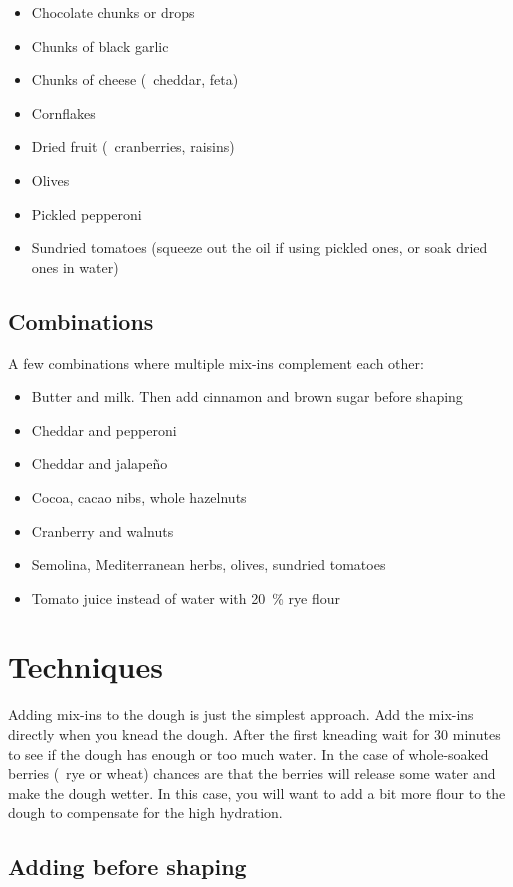 \begin{itemize}
  \item Chocolate chunks or drops
  \item Chunks of black garlic
  \item Chunks of cheese (\eg~cheddar, feta)
  \item Cornflakes
  \item Dried fruit (\eg~cranberries, raisins)
  \item Olives
  \item Pickled pepperoni
  \item Sundried tomatoes (squeeze out the oil if using pickled ones, or soak
      dried ones in water)
\end{itemize}

\subsection{Combinations}
A few combinations where multiple mix-ins complement each other:

\begin{itemize}
  \item Butter and milk. Then add cinnamon and brown sugar before shaping
  \item Cheddar and pepperoni
  \item Cheddar and jalapeño
  \item Cocoa, cacao nibs, whole hazelnuts
  \item Cranberry and walnuts
  \item Semolina, Mediterranean herbs, olives, sundried tomatoes
  \item Tomato juice instead of water with \qty{20}{\percent} rye flour
\end{itemize}

\section{Techniques}

Adding mix-ins to the dough is just the simplest approach. Add the mix-ins
directly when you knead the dough. After the first kneading wait for 30 minutes to see
if the dough has enough or too much water. In the case of whole-soaked berries
(\eg~rye or wheat) chances are that the berries will release some water and make the dough
wetter. In this case, you will want to add a bit more flour to the dough to
compensate for the high hydration.

\subsection{Adding before shaping}

